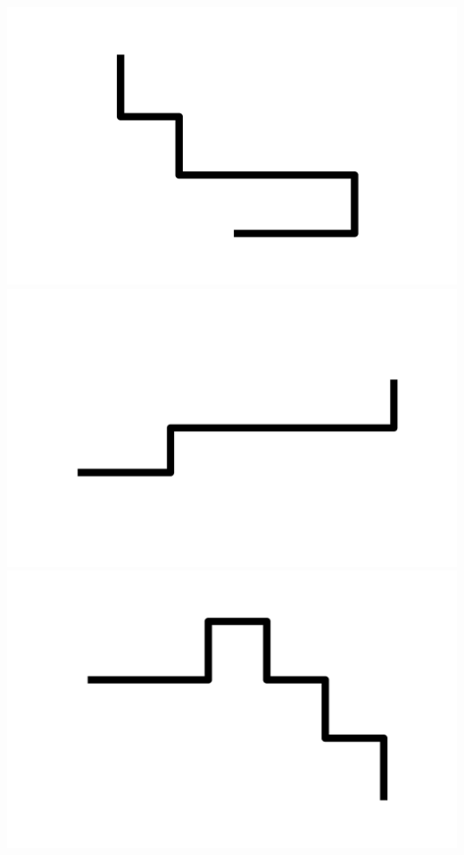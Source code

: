 \documentclass[]{report}
\begin{document}
\includegraphics[scale=.1]{pictures/21/state_cluster_shapes_397.pdf} 
\includegraphics[scale=.1]{pictures/21/state_cluster_shapes_398.pdf} 
\includegraphics[scale=.1]{pictures/21/state_cluster_shapes_399.pdf} 
\end{document}
